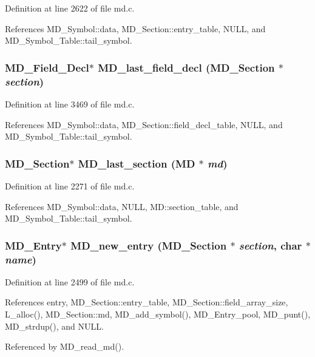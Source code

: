 Definition at line 2622 of file md.c.

References MD\_\-Symbol::data, MD\_\-Section::entry\_\-table, NULL, and MD\_\-Symbol\_\-Table::tail\_\-symbol.
\subsubsection{\setlength{\rightskip}{0pt plus 5cm}\bf{MD\_\-Field\_\-Decl}$\ast$ MD\_\-last\_\-field\_\-decl (\bf{MD\_\-Section} $\ast$ {\em section})}\label{md_8h_16c0da1adb82de9cb915f918f89298e0}




Definition at line 3469 of file md.c.

References MD\_\-Symbol::data, MD\_\-Section::field\_\-decl\_\-table, NULL, and MD\_\-Symbol\_\-Table::tail\_\-symbol.
\subsubsection{\setlength{\rightskip}{0pt plus 5cm}\bf{MD\_\-Section}$\ast$ MD\_\-last\_\-section (\bf{MD} $\ast$ {\em md})}\label{md_8h_67bb9c0b436d73924f512e5399865d94}




Definition at line 2271 of file md.c.

References MD\_\-Symbol::data, NULL, MD::section\_\-table, and MD\_\-Symbol\_\-Table::tail\_\-symbol.
\subsubsection{\setlength{\rightskip}{0pt plus 5cm}\bf{MD\_\-Entry}$\ast$ MD\_\-new\_\-entry (\bf{MD\_\-Section} $\ast$ {\em section}, char $\ast$ {\em name})}\label{md_8h_9f8fe13898aae1fcebba90fa026a3318}




Definition at line 2499 of file md.c.

References entry, MD\_\-Section::entry\_\-table, MD\_\-Section::field\_\-array\_\-size, L\_\-alloc(), MD\_\-Section::md, MD\_\-add\_\-symbol(), MD\_\-Entry\_\-pool, MD\_\-punt(), MD\_\-strdup(), and NULL.

Referenced by MD\_\-read\_\-md().
